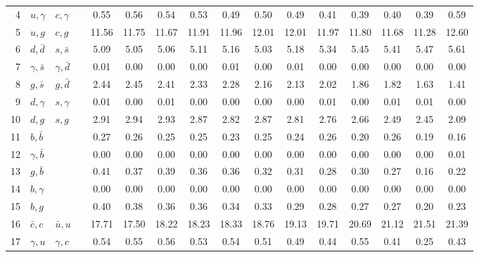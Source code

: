 \begin{tabularx}{\textwidth}{rXXX@{}S@{}S@{}S@{}S@{}S@{}S@{}S@{}S@{}S@{}S@{}S@{}S}
  4 & $u,\gamma$       & $c,\gamma$       &                 &  0.55 &  0.56 &  0.54 &  0.53 &  0.49 &  0.50 &  0.49 &  0.41 &  0.39 &  0.40 &  0.39 &  0.59 \\
  5 & $u,g$            & $c,g$            &                 & 11.56 & 11.75 & 11.67 & 11.91 & 11.96 & 12.01 & 12.01 & 11.97 & 11.80 & 11.68 & 11.28 & 12.60 \\
  6 & $d,\bar d$       & $s,\bar s$       &                 &  5.09 &  5.05 &  5.06 &  5.11 &  5.16 &  5.03 &  5.18 &  5.34 &  5.45 &  5.41 &  5.47 &  5.61 \\
  7 & $\gamma, \bar s$ & $\gamma, \bar d$ &                 &  0.01 &  0.00 &  0.00 &  0.00 &  0.01 &  0.00 &  0.01 &  0.00 &  0.00 &  0.00 &  0.00 &  0.00 \\
  8 & $g,\bar s$       & $g,\bar d$       &                 &  2.44 &  2.45 &  2.41 &  2.33 &  2.28 &  2.16 &  2.13 &  2.02 &  1.86 &  1.82 &  1.63 &  1.41 \\
  9 & $d,\gamma$       & $s,\gamma$       &                 &  0.01 &  0.00 &  0.01 &  0.00 &  0.00 &  0.00 &  0.00 &  0.01 &  0.00 &  0.01 &  0.01 &  0.00 \\
 10 & $d,g$            & $s,g$            &                 &  2.91 &  2.94 &  2.93 &  2.87 &  2.82 &  2.87 &  2.81 &  2.76 &  2.66 &  2.49 &  2.45 &  2.09 \\
 11 & $b,\bar b$       &                  &                 &  0.27 &  0.26 &  0.25 &  0.25 &  0.23 &  0.25 &  0.24 &  0.26 &  0.20 &  0.26 &  0.19 &  0.16 \\
 12 & $\gamma,\bar b$  &                  &                 &  0.00 &  0.00 &  0.00 &  0.00 &  0.00 &  0.00 &  0.00 &  0.00 &  0.00 &  0.00 &  0.00 &  0.01 \\
 13 & $g,\bar b$       &                  &                 &  0.41 &  0.37 &  0.39 &  0.36 &  0.36 &  0.32 &  0.31 &  0.28 &  0.30 &  0.27 &  0.16 &  0.22 \\
 14 & $b,\gamma$       &                  &                 &  0.00 &  0.00 &  0.00 &  0.00 &  0.00 &  0.00 &  0.00 &  0.00 &  0.00 &  0.00 &  0.00 &  0.00 \\
 15 & $b,g$            &                  &                 &  0.40 &  0.38 &  0.36 &  0.36 &  0.34 &  0.33 &  0.29 &  0.28 &  0.27 &  0.27 &  0.20 &  0.23 \\
 16 & $\bar c,c$       & $\bar u,u$       &                 & 17.71 & 17.50 & 18.22 & 18.23 & 18.33 & 18.76 & 19.13 & 19.71 & 20.69 & 21.12 & 21.51 & 21.39 \\
 17 & $\gamma, u$      & $\gamma, c$      &                 &  0.54 &  0.55 &  0.56 &  0.53 &  0.54 &  0.51 &  0.49 &  0.44 &  0.55 &  0.41 &  0.25 &  0.43 \\

\end{tabularx}
